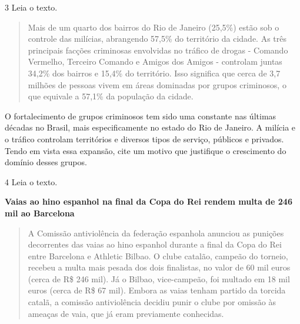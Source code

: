 
\num{3} Leia o texto.

\begin{quote}
Mais de um quarto dos bairros do Rio de Janeiro (25,5\%) estão sob o
controle das milícias, abrangendo 57,5\% do território da cidade. As
três principais facções criminosas envolvidas no tráfico de drogas -
Comando Vermelho, Terceiro Comando e Amigos dos Amigos - controlam
juntas 34,2\% dos bairros e 15,4\% do território. Isso significa que
cerca de 3,7 milhões de pessoas vivem em áreas dominadas por grupos
criminosos, o que equivale a 57,1\% da população da cidade.
\end{quote}


O fortalecimento de grupos criminosos tem sido uma constante nas últimas
décadas no Brasil, mais especificamente no estado do Rio de Janeiro. A
milícia e o tráfico controlam territórios e diversos tipos de serviço,
públicos e privados. Tendo em vista essa expansão, cite um motivo que
justifique o crescimento do domínio desses grupos.


\num{4} Leia o texto.

\textbf{Vaias ao hino espanhol na final da Copa do Rei rendem multa de 246 mil ao Barcelona}

\begin{quote}
A Comissão antiviolência da federação espanhola anunciou as punições
decorrentes das vaias ao hino espanhol durante a final da Copa do Rei
entre Barcelona e Athletic Bilbao. O clube catalão, campeão do torneio,
recebeu a multa mais pesada dos dois finalistas, no valor de 60 mil
euros (cerca de R\$ 246 mil). Já o Bilbao, vice-campeão, foi multado em
18 mil euros (cerca de R\$ 67 mil). Embora as vaias tenham partido da
torcida catalã, a comissão antiviolência decidiu punir o clube por
omissão às ameaças de vaia, que já eram previamente conhecidas.
\end{quote}

